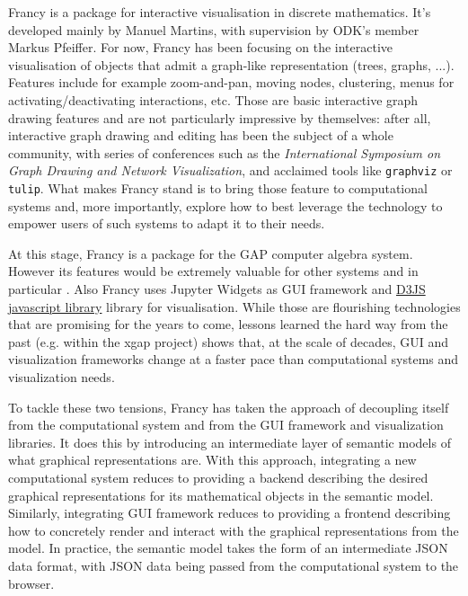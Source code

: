 \documentclass{deliverablereport}
\begin{document}
Francy is a package for interactive visualisation in discrete
mathematics. It's developed mainly by Manuel Martins, with supervision
by ODK's member Markus Pfeiffer. For now, Francy has been focusing on
the interactive visualisation of objects that admit a graph-like
representation (trees, graphs, ...). Features include for example
zoom-and-pan, moving nodes, clustering, menus for
activating/deactivating interactions, etc. Those are basic interactive
graph drawing features and are not particularly impressive by
themselves: after all, interactive graph drawing and editing has been
the subject of a whole community, with series of conferences such as
the \emph{International Symposium on Graph Drawing and Network
  Visualization}, and acclaimed tools like \lstinline{graphviz} or
\lstinline{tulip}. What makes Francy stand is to bring those feature
to computational systems and, more importantly, explore how to best
leverage the technology to empower users of such systems to adapt it
to their needs.


At this stage, Francy is a package for the GAP computer algebra
system. However its features would be extremely valuable for other
systems and in particular \Sage. Also Francy uses Jupyter Widgets as
GUI framework and \href{d3js.org}{D3JS javascript library} library for
visualisation. %
While those are flourishing technologies that are promising for the
years to come, lessons learned the hard way from the past (e.g. within
the xgap project) shows that, at the scale of decades, GUI and
visualization frameworks change at a faster pace than computational
systems and visualization needs.

To tackle these two tensions, Francy has taken the approach of
decoupling itself from the computational system and from the GUI
framework and visualization libraries. It does this by introducing an
intermediate layer of semantic models of what graphical
representations are. With this approach, integrating a new
computational system reduces to providing a backend describing the
desired graphical representations for its mathematical objects in the
semantic model. Similarly, integrating GUI framework reduces to
providing a frontend describing how to concretely render and interact
with the graphical representations from the model. In practice, the
semantic model takes the form of an intermediate JSON data format,
with JSON data being passed from the computational system to the
browser.
\end{document}
